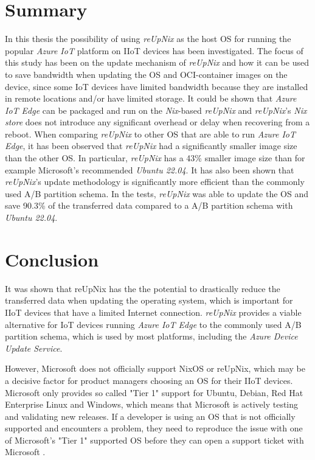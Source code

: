 \section{Summary}
In this thesis the possibility of using \textit{reUpNix} as the host \ac{OS} for 
running the popular \textit{Azure IoT} platform on \ac{IIoT} devices has been investigated.
The focus of this study has been on the update mechanism of \textit{reUpNix} and how it can be used
to save bandwidth when updating the \ac{OS} and \ac{OCI}-container images on the device,
since some \ac{IoT} devices have limited bandwidth because they are installed in
remote locations and/or have limited storage. It could be shown that \textit{Azure IoT Edge}
can be packaged and run on the \textit{Nix}-based \textit{reUpNix} and
\textit{reUpNix}'s \textit{Nix store} does not introduce any significant overhead
or delay when recovering from a reboot. When comparing \textit{reUpNix} to
other \ac{OS} that are able to run \textit{Azure IoT Edge}, it has been observed that \textit{reUpNix}
had a significantly smaller image size than the other \ac{OS}. In particular,
\textit{reUpNix} has a 43\% smaller image size than for example Microsoft's
recommended \textit{Ubuntu 22.04}. It has also been shown that \textit{reUpNix}'s update
methodology is significantly more efficient than the commonly used A/B partition
schema. In the tests, \textit{reUpNix} was able to update the \ac{OS} and save
90.3\% of the transferred data compared to a A/B partition schema with \textit{Ubuntu 22.04}.


\section{Conclusion}
It was shown that reUpNix has the the potential to drastically reduce the transferred
data when updating the operating system, which is important for \ac{IIoT} devices
that have a limited Internet connection. \textit{reUpNix} provides a viable
alternative for \ac{IoT} devices running \textit{Azure IoT Edge}
to the commonly used A/B partition schema, which is used by most platforms,
including the \textit{Azure Device Update Service}.

However, Microsoft does not officially support NixOS or reUpNix, which may be a decisive factor
for product managers choosing an \ac{OS} for their \ac{IIoT} devices. Microsoft
only provides so called "Tier 1" support for Ubuntu, Debian, Red Hat Enterprise
Linux and Windows, which means that Microsoft is actively testing and validating
new releases. If a developer is using an \ac{OS} that is not officially supported
and encounters a problem, they need to reproduce the issue with one of Microsoft's
"Tier 1" supported \ac{OS} before they can open a support ticket with Microsoft
\cite{msdoc-supportetplatforms}.

